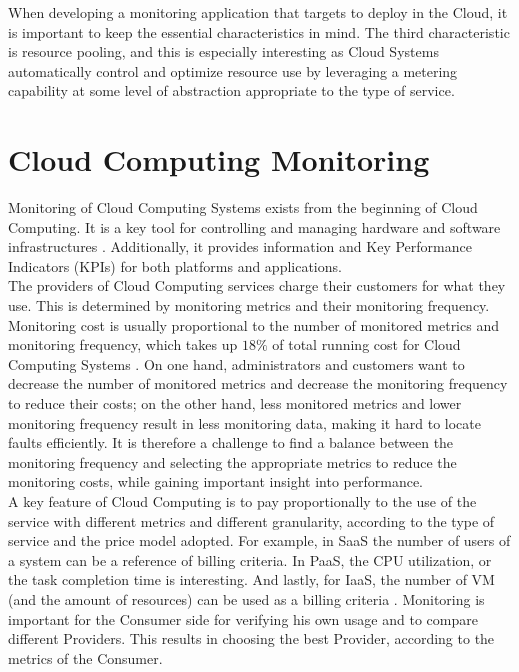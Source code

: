 \noindent
When developing a monitoring application that targets to deploy in the Cloud, it is important to keep the essential characteristics in mind. The third characteristic is resource pooling, and this is especially interesting as Cloud Systems automatically control and optimize resource use by leveraging a metering capability at some level of abstraction appropriate to the type of service.

\section{Cloud Computing Monitoring} \label{sec:intro_monitoring}
Monitoring of Cloud Computing Systems exists from the beginning of Cloud Computing. It is a key tool for controlling and managing hardware and software infrastructures \cite{aceto2013cloud}. Additionally, it provides information and Key Performance Indicators (KPIs) for both platforms and applications.\\

\noindent
The providers of Cloud Computing services charge their customers for what they use. This is determined by monitoring metrics and their monitoring frequency. Monitoring cost is usually proportional to the number of monitored metrics and monitoring frequency, which takes up $18\%$ of total running cost for Cloud Computing Systems \cite{wang2018self}. On one hand, administrators and customers want to decrease the number of monitored metrics and decrease the monitoring frequency to reduce their costs; on the other hand, less monitored metrics and lower monitoring frequency result in less monitoring data, making it hard to locate faults efficiently. It is therefore a challenge to find a balance between the monitoring frequency and selecting the appropriate metrics to reduce the monitoring costs, while gaining important insight into performance.\\

\noindent
A key feature of Cloud Computing is to pay proportionally to the use of the service with different metrics and different granularity, according to the type of service and the price model adopted. For example, in SaaS the number of users of a system can be a reference of billing criteria. In PaaS, the CPU utilization, or the task completion time is interesting. And lastly, for IaaS, the number of VM (and the amount of resources) can be used as a billing criteria \cite{katsaros2011building}. Monitoring is important for the Consumer side for verifying his own usage and to compare different Providers. This results in choosing the best Provider, according to the metrics of the Consumer.\\

